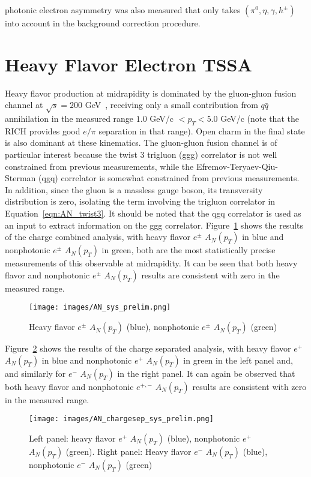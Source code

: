 \documentclass[submission, Proceedings]{SciPost}
\begin{document}
photonic electron asymmetry was also measured that only takes $(\pi^{0}, \eta, \gamma, h^{\pm})$ into account in the background correction procedure. 

\section{Heavy Flavor Electron TSSA}\label{sec:electrons}
Heavy flavor production at midrapidity is dominated by the gluon-gluon fusion channel at $\sqrt{s} = 200$ GeV~\cite{trigluon_twists}, receiving only a small contribution from $q \bar{q}$ annihilation in the measured range $1.0$ GeV/c $< p_{T} < 5.0$ GeV/c (note that the RICH provides good $e/\pi$ separation in that range). Open charm in the final state is also dominant at these kinematics. The gluon-gluon fusion channel is of particular interest because the twist 3 trigluon (ggg) correlator is not well constrained from previous measurements, while the Efremov-Teryaev-Qiu-Sterman (qgq) correlator is somewhat constrained from previous measurements. In addition, since the gluon is a massless gauge boson, its transversity distribution is zero, isolating the term involving the trigluon correlator in Equation~\ref{eqn:AN_twist3}. It should be noted that the qgq correlator is used as an input to extract information on the ggg correlator. Figure~\ref{fig:AN_chargecombined} shows the results of the charge combined analysis, with heavy flavor $e^{\pm}$ $A_{N}(p_{T})$ in blue and nonphotonic $e^{\pm}$ $A_{N}(p_{T})$ in green, both are the most statistically precise measurements of this observable at midrapidity. It can be seen that both heavy flavor and nonphotonic $e^{\pm}$ $A_{N}(p_{T})$ results are consistent with zero in the measured range.
\begin{figure}[H]
    \centering
    \texttt{[image: images/AN\_sys\_prelim.png]}
    \caption{Heavy flavor $e^{\pm}$ $A_{N}(p_{T})$ (blue), nonphotonic $e^{\pm}$ $A_{N}(p_{T})$ (green)}
    \label{fig:AN_chargecombined}
\end{figure}
\noindent Figure~\ref{fig:AN_chargesep} shows the results of the charge separated analysis, with heavy flavor $e^{+}$ $A_{N}(p_{T})$ in blue and nonphotonic $e^{+}$ $A_{N}(p_{T})$ in green in the left panel and, and similarly for $e^{-}$ $A_{N}(p_{T})$ in the right panel. It can again be observed that both heavy flavor and nonphotonic $e^{+,-}$ $A_{N}(p_{T})$ results are consistent with zero in the measured range.
\begin{figure}[H]
    \centering
    \texttt{[image: images/AN\_chargesep\_sys\_prelim.png]}
    \caption{Left panel: heavy flavor $e^{+}$ $A_{N}(p_{T})$ (blue), nonphotonic $e^{+}$ $A_{N}(p_{T})$ (green). Right panel: Heavy flavor $e^{-}$ $A_{N}(p_{T})$ (blue), nonphotonic $e^{-}$ $A_{N}(p_{T})$ (green) }
    \label{fig:AN_chargesep}
\end{figure}
\end{document}
